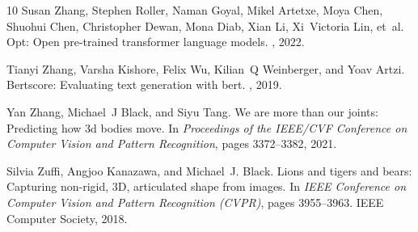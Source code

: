 \documentclass{article}
\begin{document}
{\begin{thebibliography}{10}
  Susan Zhang, Stephen Roller, Naman Goyal, Mikel Artetxe, Moya Chen, Shuohui
    Chen, Christopher Dewan, Mona Diab, Xian Li, Xi~Victoria Lin, et~al.
  \newblock Opt: Open pre-trained transformer language models.
  , 2022.
  
  Tianyi Zhang, Varsha Kishore, Felix Wu, Kilian~Q Weinberger, and Yoav Artzi.
  \newblock Bertscore: Evaluating text generation with bert.
  , 2019.
  
  Yan Zhang, Michael~J Black, and Siyu Tang.
  \newblock We are more than our joints: Predicting how 3d bodies move.
  \newblock In {\em Proceedings of the IEEE/CVF Conference on Computer Vision and
    Pattern Recognition}, pages 3372--3382, 2021.
  
  Silvia Zuffi, Angjoo Kanazawa, and Michael~J. Black.
  \newblock Lions and tigers and bears: Capturing non-rigid, {3D}, articulated
    shape from images.
  \newblock In {\em IEEE Conference on Computer Vision and Pattern Recognition
    (CVPR)}, pages 3955--3963. IEEE Computer Society, 2018.
  
  \end{thebibliography}
  
}

\newpage
\section*{}
\vspace{80pt}




\end{document}
